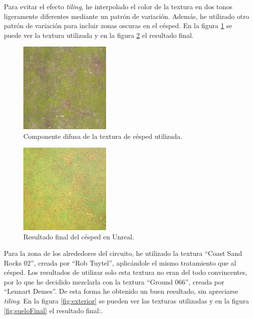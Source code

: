 Para evitar el efecto \textit{tiling}, he interpolado el color de la textura en dos tonos ligeramente diferentes mediante un patrón de variación. Además, he utilizado otro patrón de variación para incluir zonas oscuras en el césped. En la figura \ref{fig:grasstexture} se puede ver la textura utilizada y en la figura \ref{fig:grassfinal} el resultado final.

\begin{figure}[H]
    \centering
    \includegraphics[width=0.4\textwidth]{imagenes/converted/Ground037_1K_Color.jpg}
    \caption{Componente difusa de la textura de césped utilizada.}
    \label{fig:grasstexture}
\end{figure}

\begin{figure}[H]
    \centering
    \includegraphics[width=0.4\textwidth]{imagenes/converted/cespedTextFinal}
    \caption{Resultado final del césped en Unreal.}
    \label{fig:grassfinal}
\end{figure}

Para la zona de los alrededores del circuito, he utilizado la textura ``Coast Sand Rocks 02''\cite{coastsand}, creada por ``Rob Tuytel'', aplicándole el mismo tratamiento que al césped. Los resultados de utilizar solo esta textura no eran del todo convincentes, por lo que he decidido mezclarla con la textura ``Ground 066''\cite{ground066}, creada por ``Lennart Demes''. De esta forma he obtenido un buen resultado, sin apreciarse \textit{tiling}. En la figura \ref{fig:exterior} se pueden ver las texturas utilizadas y en la figura \ref{fig:sueloFinal} el resultado final:.

